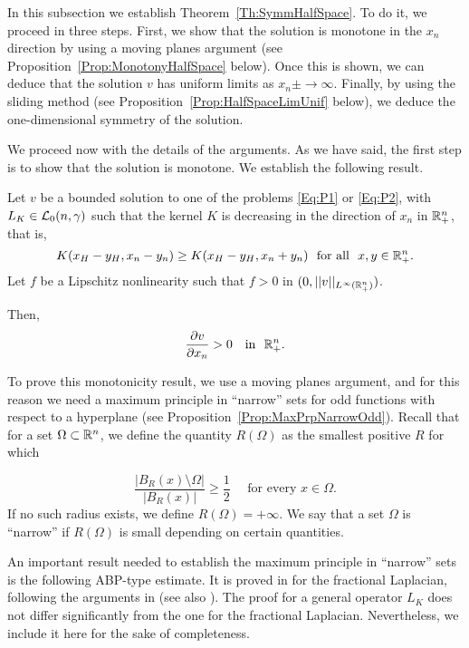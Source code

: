 In this subsection we establish Theorem~\ref{Th:SymmHalfSpace}. To do it, we proceed in three steps. First, we show that the solution is monotone in the $x_n$ direction by using a moving planes argument (see Proposition~\ref{Prop:MonotonyHalfSpace} below). Once this is shown, we can deduce that the solution $v$ has uniform limits as $x_n\pm\to \infty$. Finally, by using the sliding method (see Proposition~\ref{Prop:HalfSpaceLimUnif} below), we deduce the one-dimensional symmetry of the solution.

We proceed now with the details of the arguments. As we have said, the first step is to show that the solution is monotone. We establish the following result.

\begin{proposition}
	\label{Prop:MonotonyHalfSpace}
	Let $v$ be a bounded solution to one of the problems \eqref{Eq:P1} or \eqref{Eq:P2}, with $L_K \in \mathcal{L}_0(n,\gamma)$ such that the kernel $K$ is decreasing in the direction of $x_n$ in $\mathbb{R}^n_+$, that is, 
	$$
	K(x_H-y_H,x_n-y_n) \geq K(x_H-y_H,x_n+y_n) \,\,\,\,\text{for all } \,\, x,y\in \mathbb{R}^n_+.
	$$
	Let $f$ be a Lipschitz nonlinearity such that $f>0$ in $(0,||v||_{L^\infty(\mathbb{R}^n_+)})$. 
	
	Then,
	$$
	\frac{\partial v}{\partial x_n} > 0 \,\,\,\, \text{ in } \,\,\mathbb{R}^n_+.
	$$
\end{proposition}

To prove this monotonicity result, we use a moving planes argument, and for this reason we need a maximum principle in ``narrow'' sets for odd functions with respect to a hyperplane (see Proposition~\ref{Prop:MaxPrpNarrowOdd}). Recall that for a set $\Omega \subset \mathbb{R}^n$, we define the quantity $R(\Omega)$ as the smallest positive $R$ for which

\begin{equation}
	\label{Eq:DefNarrow}
	\dfrac{|B_R(x)\setminus \Omega|}{|B_R(x)|}\geq \dfrac{1}{2} \quad \text{ for every } x \in \Omega.
\end{equation}
If no such radius exists, we define $R(\Omega) = +\infty$. We say that a set $\Omega$ is ``narrow'' if $R(\Omega)$ is small depending on certain quantities.

An important result needed to establish the maximum principle in ``narrow'' sets is the following ABP-type estimate. It is proved in \cite{QuaasXia} for the fractional Laplacian, following the arguments in \cite{Cabre-ABP} (see also \cite{Cabre-Topics}). The proof for a general operator $L_K$ does not differ significantly from the one for the fractional Laplacian. Nevertheless, we include it here for the sake of completeness.

